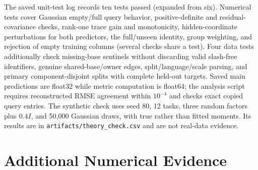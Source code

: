 \documentclass{article}
\begin{document}
The saved unit-test log records ten tests passed (expanded from six). Numerical tests cover Gaussian empty/full query behavior, positive-definite and residual-covariance checks, rank-one trace gain and monotonicity, hidden-coordinate perturbations for both predictors, the full/unseen identity, group weighting, and rejection of empty training columns (several checks share a test). Four data tests additionally check missing-base sentinels without discarding valid slash-free identifiers, genuine shared-base/owner edges, split/language/scale parsing, and primary component-disjoint splits with complete held-out targets. Saved main predictions are float32 while metric computation is float64; the analysis script requires reconstructed RMSE agreement within $10^{-4}$ and checks exact copied query entries. The synthetic check uses seed 80, 12 tasks, three random factors plus $0.4I$, and 50,000 Gaussian draws, with true rather than fitted moments. Its results are in \texttt{artifacts/theory\_check.csv} and are not real-data evidence.

\section{Additional Numerical Evidence}
\label{app:tables}
\begin{table}[ht]
\caption{MTEB split-11 paired effects at $k=8$. $\Delta$ RMSE is trace-risk minus comparator, so negative favors trace-risk. Intervals are marginal 95\% component-block percentile intervals conditional on fixed fits. Tests use paired component MSE differences; their $p$-values need not agree with bootstrap RMSE-interval exclusions. Holm covers eight comparisons. With six components no corrected rejection is attainable.}
\label{tab:inference}
\centering

\end{table}

\begin{table}[ht]
\caption{Pair-specific common-unseen RMSE on MTEB split 11 at $k=8$ (lower is better). Only tasks queried by neither policy are scored. Shared-task counts and MSEs are averaged over random paths where applicable before taking square roots. Intersections differ by comparator, so rows cannot be treated as one common-target leaderboard.}
\label{tab:common}
\centering

\end{table}

\begin{table}[ht]
\caption{MTEB full-suite group-macro RMSE for every split at the fixed budget $k=8$. Seeds overlap in model/component membership and are not independent test samples.}
\label{tab:perseed}
\centering

\end{table}
\end{document}
